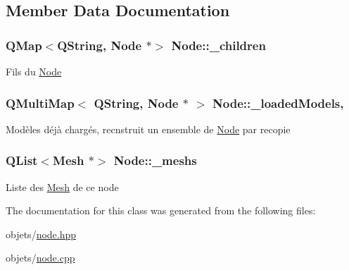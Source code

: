 \subsection{Member Data Documentation}
\hypertarget{class_node_aac0c3b4b1f41b26ec5a22d77f067ec5b}{
\subsubsection[{\+\_\+children}]{\setlength{\rightskip}{0pt plus 5cm}Q\+Map$<$Q\+String, {\bf Node} $\ast$$>$ Node\+::\+\_\+children\hspace{0.3cm}{\ttfamily [private]}}}\label{class_node_aac0c3b4b1f41b26ec5a22d77f067ec5b}
Fils du \hyperlink{class_node}{Node} \hypertarget{class_node_a2e510fe62f9ef864668e32ef9269543c}{
\subsubsection[{\+\_\+loaded\+Models}]{\setlength{\rightskip}{0pt plus 5cm}Q\+Multi\+Map$<$ Q\+String, {\bf Node} $\ast$ $>$ Node\+::\+\_\+loaded\+Models\hspace{0.3cm}{\ttfamily [static]}, {\ttfamily [private]}}}\label{class_node_a2e510fe62f9ef864668e32ef9269543c}
Modèles déjà chargés, recnstruit un ensemble de \hyperlink{class_node}{Node} par recopie \hypertarget{class_node_aad5e459a1ed03d6e09ad7054f2014f5a}{
\subsubsection[{\+\_\+meshs}]{\setlength{\rightskip}{0pt plus 5cm}Q\+List$<${\bf Mesh} $\ast$$>$ Node\+::\+\_\+meshs\hspace{0.3cm}{\ttfamily [private]}}}\label{class_node_aad5e459a1ed03d6e09ad7054f2014f5a}
Liste des \hyperlink{class_mesh}{Mesh} de ce node 

The documentation for this class was generated from the following files\+:\begin{DoxyCompactItemize}
\item 
objets/\hyperlink{node_8hpp}{node.\+hpp}\item 
objets/\hyperlink{node_8cpp}{node.\+cpp}\end{DoxyCompactItemize}
